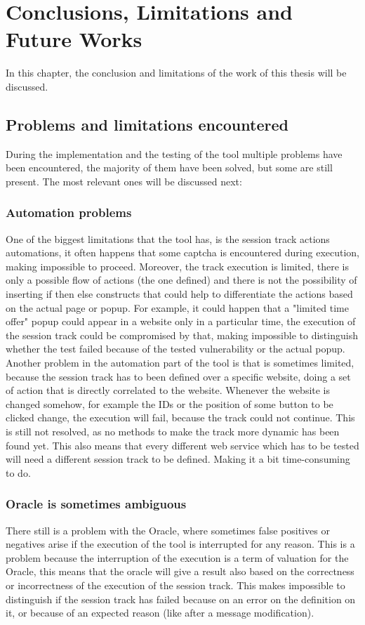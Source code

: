 \chapter{Conclusions, Limitations and Future Works}
In this chapter, the conclusion and limitations of the work of this thesis will be discussed.

\section{Problems and limitations encountered}
During the implementation and the testing of the tool multiple problems have been encountered, the majority of them have been solved, but some are still present. The most relevant ones will be discussed next:

\subsection{Automation problems}
One of the biggest limitations that the tool has, is the session track actions automations, it often happens that some captcha is encountered during execution, making impossible to proceed. Moreover, the track execution is limited, there is only a possible flow of actions (the one defined) and there is not the possibility of inserting if then else constructs that could help to differentiate the actions based on the actual page or popup. For example, it could happen that a "limited time offer" popup could appear in a website only in a particular time, the execution of the session track could be compromised by that, making impossible to distinguish whether the test failed because of the tested vulnerability or the actual popup.
Another problem in the automation part of the tool is that is sometimes limited, because the session track has to been defined over a specific website, doing a set of action that is directly correlated to the website. Whenever the website is changed somehow, for example the IDs or the position of some button to be clicked change, the execution will fail, because the track could not continue.
This is still not resolved, as no methods to make the track more dynamic has been found yet. This also means that every different web service which has to be tested will need a different session track to be defined. Making it a bit time-consuming to do. 

\subsection{Oracle is sometimes ambiguous}
There still is a problem with the Oracle, where sometimes false positives or negatives arise if the execution of the tool is interrupted for any reason. This is a problem because the interruption of the execution is a term of valuation for the Oracle, this means that the oracle will give a result also based on the correctness or incorrectness of the execution of the \gls{session track}. This makes impossible to distinguish if the \gls{session track} has failed because on an error on the definition on it, or because of an expected reason (like after a message modification).

